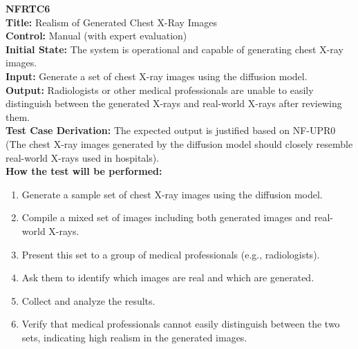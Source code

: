 \documentclass[12pt, titlepage]{article}
\begin{document}
\textbf{NFRTC6}\\
\textbf{Title:} Realism of Generated Chest X-Ray Images\\
\textbf{Control:} Manual (with expert evaluation)\\
\textbf{Initial State:} The system is operational and capable of generating chest X-ray images.\\
\textbf{Input:} Generate a set of chest X-ray images using the diffusion model.\\
\textbf{Output:} Radiologists or other medical professionals are unable to easily distinguish between the generated X-rays and real-world X-rays after reviewing them.\\
\textbf{Test Case Derivation:} The expected output is justified based on NF-UPR0 (The chest X-ray images generated by the diffusion model should closely resemble real-world X-rays used in hospitals).\\
\textbf{How the test will be performed:}
\begin{enumerate}
  \item Generate a sample set of chest X-ray images using the diffusion model.
  \item Compile a mixed set of images including both generated images and real-world X-rays.
  \item Present this set to a group of medical professionals (e.g., radiologists).
  \item Ask them to identify which images are real and which are generated.
  \item Collect and analyze the results.
  \item Verify that medical professionals cannot easily distinguish between the two sets, indicating high realism in the generated images.
\end{enumerate}
\vspace{1em}
\end{document}

